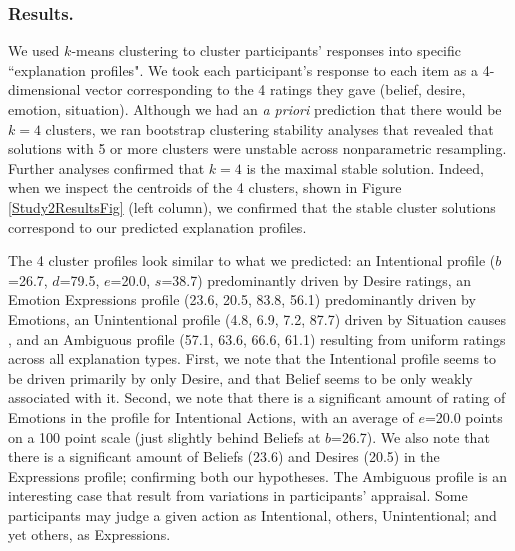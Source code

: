 \documentclass[10pt,letterpaper]{article}
\begin{document}
\subsubsection{Results.} 
We used $k$-means clustering to cluster participants' responses into specific ``explanation profiles". We took each participant's response to each item as a 4-dimensional vector corresponding to the 4 ratings they gave (belief, desire, emotion, situation). Although we had an \textit{a priori} prediction that there would be $k=4$ clusters, we ran bootstrap clustering stability analyses \cite{Hennig2007} that revealed that solutions with 5 or more clusters were unstable across nonparametric resampling. Further analyses confirmed that $k=4$ is the maximal stable solution. Indeed, when we inspect the centroids of the 4 clusters, shown in Figure \ref{Study2ResultsFig} (left column), we confirmed that the stable cluster solutions correspond to our predicted explanation profiles.






The 4 cluster profiles look similar to what we predicted: an Intentional profile ($b$=26.7, $d$=79.5, $e$=20.0, $s$=38.7) predominantly driven by Desire ratings, an Emotion Expressions profile (23.6, 20.5, 83.8, 56.1) predominantly driven by Emotions, an Unintentional profile (4.8, 6.9, 7.2, 87.7) driven by Situation causes , and an Ambiguous profile (57.1, 63.6, 66.6, 61.1) resulting from uniform ratings across all explanation types. First, we note that the Intentional profile seems to be driven primarily by only Desire, and that Belief seems to be only weakly associated with it. Second, we note that there is a significant amount of rating of Emotions in the profile for Intentional Actions, with an average of $e$=20.0 points on a 100 point scale (just slightly behind Beliefs at $b$=26.7). We also note that there is a significant amount of Beliefs (23.6) and Desires (20.5) in the Expressions profile; confirming both our hypotheses. 
The Ambiguous profile is an interesting case that result from variations in participants' appraisal. Some participants may judge a given action as Intentional, others, Unintentional; and yet others, as Expressions. %
\end{document}
